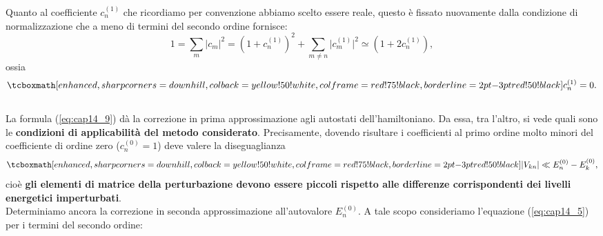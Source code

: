 Quanto al coefficiente $c_n ^{(1)}$ che ricordiamo per convenzione abbiamo scelto essere reale, questo è fissato nuovamente dalla condizione di normalizzazione che a meno di termini del secondo ordine fornisce:
	\begin{equation}
		1= \sum _m \vert c_m \vert ^2 = \left( 1+ c_n ^{(1)}\right) ^2+ \sum _{m\neq n } \vert c_m ^{(1)} \vert ^2 \simeq \left( 1+ 2c_n ^{(1)}\right),
	\end{equation}
ossia
	\begin{equation}
		\tcboxmath[enhanced, sharp corners=downhill, colback=yellow!50!white, colframe=red!75!black, borderline={2pt}{-3pt}{red!50!black}]{
			c_n ^{(1)} =0.
			}
	\label{eq:cap14_10}
	\end{equation}\\
	
La formula (\ref{eq:cap14_9}) dà la correzione in prima approssimazione agli autostati dell'hamiltoniano. Da essa, tra l'altro, si vede quali sono le \textbf{condizioni di applicabilità del metodo considerato}. Precisamente, dovendo risultare i coefficienti al primo ordine molto minori del coefficiente di ordine zero ($c_n ^{(0)} =1$) deve valere la diseguaglianza
	\begin{equation}
		\tcboxmath[enhanced, sharp corners=downhill, colback=yellow!50!white, colframe=red!75!black, borderline={2pt}{-3pt}{red!50!black}]{
			\vert V_{kn} \vert \ll E_ n ^{(0)}-E_ k ^{(0)},
		}
	\end{equation}
cioè \textbf{gli elementi di matrice della perturbazione devono essere piccoli rispetto alle differenze corrispondenti dei livelli energetici imperturbati}.\\

Determiniamo ancora la correzione in seconda approssimazione all'autovalore $E_n ^{(0)}$. A tale scopo consideriamo l'equazione (\ref{eq:cap14_5}) per i termini del secondo ordine:\\


